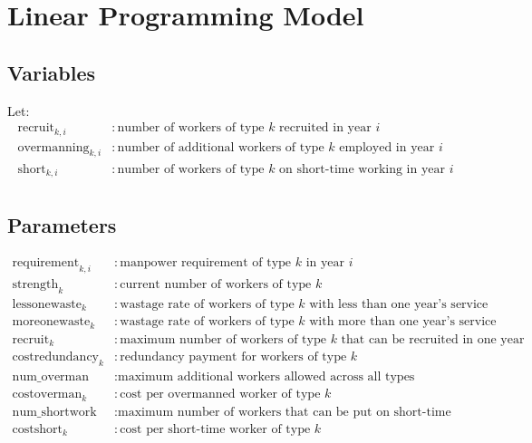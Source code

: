 \documentclass{article}
\begin{document}
\section*{Linear Programming Model}

\subsection*{Variables}
Let:
\begin{align*}
\text{recruit}_{k,i} & : \text{number of workers of type } k \text{ recruited in year } i \\
\text{overmanning}_{k,i} & : \text{number of additional workers of type } k \text{ employed in year } i \\
\text{short}_{k,i} & : \text{number of workers of type } k \text{ on short-time working in year } i \\
\end{align*}

\subsection*{Parameters}
\begin{align*}
\text{requirement}_{k,i} & : \text{manpower requirement of type } k \text{ in year } i \\
\text{strength}_{k} & : \text{current number of workers of type } k \\
\text{lessonewaste}_{k} & : \text{wastage rate of workers of type } k \text{ with less than one year's service} \\
\text{moreonewaste}_{k} & : \text{wastage rate of workers of type } k \text{ with more than one year's service} \\
\text{recruit}_{k} & : \text{maximum number of workers of type } k \text{ that can be recruited in one year} \\
\text{costredundancy}_{k} & : \text{redundancy payment for workers of type } k \\
\text{num\_overman} & : \text{maximum additional workers allowed across all types} \\
\text{costoverman}_{k} & : \text{cost per overmanned worker of type } k \\
\text{num\_shortwork} & : \text{maximum number of workers that can be put on short-time working} \\
\text{costshort}_{k} & : \text{cost per short-time worker of type } k \\
\end{align*}
\end{document}

